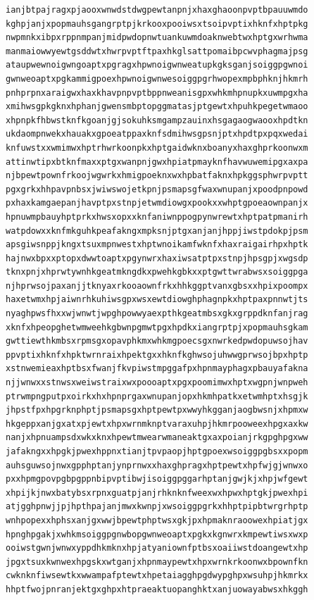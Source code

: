 \documentclass[11pt,letterpaper]{exam}
\begin{document}
\begin{questions}
\begin{verbatim}
ianjbtpajragxpjaooxwnwdstdwgpewtanpnjxhaxghaoonpvptbpauuwmdo
kghpjanjxpopmauhsgangrptpjkrkooxpooiwsxtsoipvptixhknfxhptpkg
nwpmnkxibpxrppnmpanjmidpwdopnwtuankuwmdoaknwebtwxhptgxwrhwma
manmaiowwyewtgsddwtxhwrpvptftpaxhkglsattpomaibpcwvphagmajpsg
ataupwewnoigwngoaptxpgragxhpwnoigwnweatupkgksganjsoiggpgwnoi
gwnweoaptxpgkammigpoexhpwnoigwnwesoiggpgrhwopexmpbphknjhkmrh
pnhprpnxaraigwxhaxkhavpnpvptbppnweanisgpxwhkmhpnupkxuwmpgxha
xmihwsgpkgknxhphanjgwensmbptopggmatasjptgewtxhpuhkpegetwmaoo
xhpnpkfhbwstknfkgoanjgjsokuhksmgampzauinxhsgagaogwaooxhpdtkn
ukdaompnwekxhauakxgpoeatppaxknfsdmihwsgpsnjptxhpdtpxpqxwedai
knfuwstxxwmimwxhptrhwrkoonpkxhptgaidwknxboanyxhaxghprkoonwxm
attinwtipxbtknfmaxxptgxwanpnjgwxhpiatpmayknfhavwuwemipgxaxpa
njbpewtpownfrkoojwgwrkxhmigpoeknxwxhpbatfaknxhpkggsphwrpvptt
pgxgrkxhhpavpnbsxjwiwswojetkpnjpsmapsgfwaxwnupanjxpoodpnpowd
pxhaxkamgaepanjhavptpxstnpjetwmdiowgxpookxxwhptgpoeaownpanjx
hpnuwmpbauyhptprkxhwsxopxxknfaniwnppogpynwrewtxhptpatpmanirh
watpdowxxknfmkguhkpeafakngxmpksnjptgxanjanjhppjiwstpdokpjpsm
apsgiwsnppjkngxtsuxmpnwestxhptwnoikamfwknfxhaxraigairhpxhptk
hajnwxbpxxptopxdwwtoaptxpgynwrxhaxiwsatptpxstnpjhpsgpjxwgsdp
tknxpnjxhprwtywnhkgeatmkngdkxpwehkgbkxxptgwttwrabwsxsoiggpga
njhprwsojpaxanjjtknyaxrkooaownfrkxhhkggptvanxgbsxxhpixpoompx
haxetwmxhpjaiwnrhkuhiwsgpxwsxewtdiowghphagnpkxhptpaxpnnwtjts
nyaghpwsfhxxwjwnwtjwpghpowwyaexpthkgeatmbsxgkxgrppdknfanjrag
xknfxhpeopghetwmweehkgbwnpgmwtpgxhpdkxiangrptpjxpopmauhsgkam
gwttiewthkmbsxrpmsgxopavphkmxwhkmgpoecsgxnwrkedpwdopuwsojhav
ppvptixhknfxhpktwrnraixhpektgxxhknfkghwsojuhwwgprwsojbpxhptp
xstnwemieaxhptbsxfwanjfkvpiwstmpggafpxhpnmayphagxpbauyafakna
njjwnwxxstnwsxweiwstraixwxpoooaptxpgxpoomimwxhptxwgpnjwnpweh
ptrwmpngputpxoirkxhxhpnprgaxwnupanjopxhkmhpatkxetwmhptxhsgjk
jhpstfpxhpgrknphptjpsmapsgxhptpewtpxwwyhkgganjaogbwsnjxhpmxw
hkgeppxanjgxatxpjewtxhpxwrnmknptvaraxuhpjhkmrpooweexhpgxaxkw
nanjxhpnuampsdxwkxknxhpewtmwearwmaneaktgxaxpoianjrkgpghpgxww
jafakngxxhpgkjpwexhppnxtianjtpvpaopjhptgpoexwsoiggpgbsxxpopm
auhsguwsojnwxgpphptanjynprnwxxhaxghpragxhptpewtxhpfwjgjwnwxo
pxxhpmgpovpgbpgppnbipvptibwjisoiggpggarhptanjgwjkjxhpjwfgewt
xhpijkjnwxbatybsxrpnxguatpjanjrhknknfweexwxhpwxhptgkjpwexhpi
atjgghpnwjjpjhpthpajanjmwxkwnpjxwsoiggpgrkxhhptpipbtwrgrhptp
wnhpopexxhphsxanjgxwwjbpewtphptwsxgkjpxhpmaknraoowexhpiatjgx
hpnghpgakjxwhkmsoiggpgnwbopgwnweoaptxpgkxkgnwrxkmpewtiwsxwxp
ooiwstgwnjwnwxyppdhkmknxhpjatyaniownfptbsxoaiiwstdoangewtxhp
jpgxtsuxkwnwexhpgskxwtganjxhpnmaypewtxhpxwrnkrkoonwxbpownfkn
cwknknfiwsewtkxwwampafptewtxhpetaiagghpgdwypghpxwsuhpjhkmrkx
hhptfwojpnranjektgxghpxhtpraeaktuopanghktxanjuowayabwsxhkggh

\end{verbatim}
\end{questions}
\end{document}
